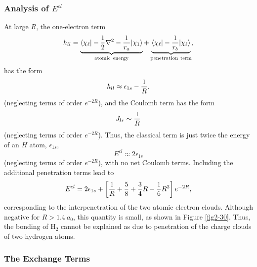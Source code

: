  
\subsubsection{Analysis of $E^{cl}$}

At large $R$, the one-electron term
\begin{equation}
h_{ll} = \underbrace{\langle \chi_\ell \vert - {1 \over 2} \nabla^2 - 
{1 \over r_a} \vert \chi_1 \rangle}_{{\rm atomic ~ energy}} + 
\underbrace{\langle \chi_\ell \vert - {1 \over r_b} \vert \chi_\ell 
\rangle}_{{\rm penetration ~ term}} ,
\end{equation}
has the form
\begin{equation}
h_{ll} \approx \epsilon_{1s} - {1 \over R} .
\end{equation}
(neglecting terms of order $e^{-2R}$), and the Coulomb term has the
form
\begin{equation}
J_{lr} \sim {1 \over R}
\end{equation}
(neglecting terms of order $e^{-2R}$).  Thus, the classical term is
just twice the energy of an $H$ atom, $\epsilon_{1s}$, 
\begin{equation}
E^{cl} \approx 2\epsilon_{1s}
\end{equation}
(neglecting terms of order $e^{-2R}$), with no net Coulomb terms.
Including the additional penetration terms lead to
\begin{equation}
E^{cl} = 2 \epsilon_{1s} + \left[ {1 \over R} + {5 \over 8} + {3 \over 
4} R - {1 \over 6} R^2 \right] e^{-2R} ,
\end{equation}
corresponding to the interpenetration of the two atomic electron
clouds.  Although negative for $R > 1.4\ a_0$, this quantity is small,
as shown in Figure \ref{fig2-30}. Thus, the bonding of H$_2$ cannot be
explained as due to penetration of the charge clouds of two hydrogen
atoms.

\subsubsection{The Exchange Terms}

